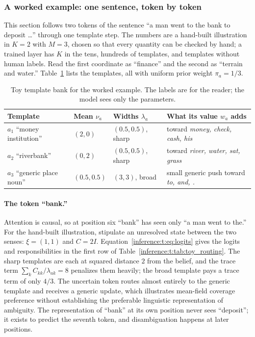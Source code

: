 \documentclass[11pt]{article}
\theoremstyle{definition}
\theoremstyle{remark}
\begin{document}
\subsubsection{A worked example: one sentence, token by token}
\label{inference:t:sec:example}

This section follows two tokens of the sentence ``a man went to the bank to deposit \dots'' through one template step. The numbers are a hand-built illustration in $K=2$ with $M=3$, chosen so that every quantity can be checked by hand; a trained layer has $K$ in the tens, hundreds of templates, and templates without human labels. Read the first coordinate as ``finance'' and the second as ``terrain and water.'' Table~\ref{inference:t:tab:toy_templates} lists the templates, all with uniform prior weight $\pi_a=1/3$.

\begin{table}[h]
\centering
\begin{tabular}{@{}llll@{}}
\toprule
Template & Mean $\nu_a$ & Widths $\lambda_a$ & What its value $w_a$ adds \\
\midrule
$a_1$ ``money institution'' & $(2,0)$ & $(0.5,0.5)$, sharp & toward \emph{money, check, cash, his} \\
$a_2$ ``riverbank'' & $(0,2)$ & $(0.5,0.5)$, sharp & toward \emph{river, water, sat, grass} \\
$a_3$ ``generic place noun'' & $(0.5,0.5)$ & $(3,3)$, broad & small generic push toward \emph{to, and, .} \\
\bottomrule
\end{tabular}
\caption{Toy template bank for the worked example. The labels are for the reader; the model sees only the parameters.}
\label{inference:t:tab:toy_templates}
\end{table}

\paragraph{The token ``bank.''}
Attention is causal, so at position six ``bank'' has seen only ``a man went to the.'' For the hand-built illustration, stipulate an unresolved state between the two senses: $\xi=(1,1)$ and $C=2I$. Equation~\eqref{inference:t:eq:logits} gives the logits and responsibilities in the first row of Table~\ref{inference:t:tab:toy_routing}. The sharp templates are each at squared distance $2$ from the belief, and the trace term $\sum_kC_{kk}/\lambda_{ak}=8$ penalizes them heavily; the broad template pays a trace term of only $4/3$. The uncertain token routes almost entirely to the generic template and receives a generic update, which illustrates mean-field coverage preference without establishing the preferable linguistic representation of ambiguity. The representation of ``bank'' at its own position never sees ``deposit''; it exists to predict the seventh token, and disambiguation happens at later positions.
\end{document}
